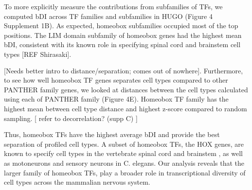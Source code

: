 To more explicitly measure the contributions from subfamilies of TFs, we computed bDI across TF families and subfamilies in HUGO (Figure 4 Supplement 1B). As expected, homeobox subfamilies occupied most of the top positions. The LIM domain subfamily of homeobox genes had the highest mean bDI, consistent with its known role in specifying spinal cord and brainstem cell types [REF Shirasaki]. 

[Needs better intro to distance/separation; comes out of nowhere]. Furthermore, to see how well homeobox TF genes separates cell types compared to other PANTHER family genes, we looked at distances between the cell types calculated using each of PANTHER family (Figure 4E). Homeobox TF family has the highest mean between cell type distance and highest z-score compared to random sampling. [ refer to decorrelation? (supp C) ]

Thus, homeobox TFs have the highest average bDI and provide the best separation of profiled cell types. A subset of homeobox TFs, the HOX genes, are known to specify cell types in the vertebrate spinal cord and brainstem \cite{Dasen_2009,Philippidou_2013}, as well as motoneurons \cite{Kratsios_2017} and sensory neurons \cite{Zheng_2015} in C. elegans. Our analysis reveals that the larger family of homeobox TFs, play a broader role in transcriptional diversity of cell types across the mammalian nervous system.

